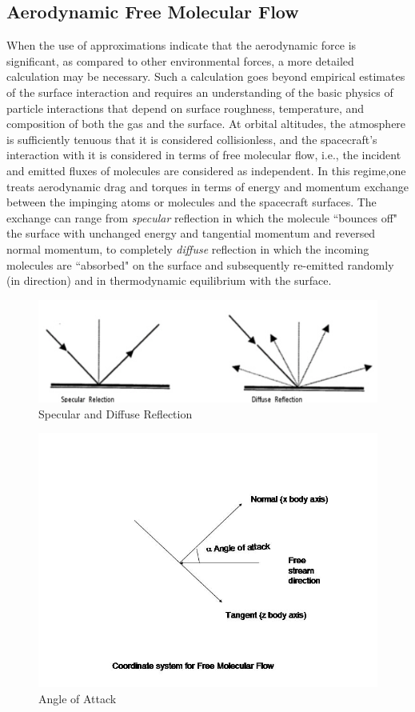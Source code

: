 \subsection{Aerodynamic Free Molecular Flow}
When the use of approximations indicate that the aerodynamic force is
significant, as compared to other environmental forces, a more detailed
calculation may be necessary. Such a calculation goes beyond empirical
estimates of the surface interaction and requires an understanding of the
basic physics of particle interactions that depend on surface roughness,
temperature, and composition of both the gas and the surface.  At orbital
altitudes, the atmosphere is sufficiently tenuous that it is
considered collisionless, and the spacecraft's interaction with it is
considered in terms of free molecular flow, i.e., the incident and emitted
fluxes of molecules are considered as independent.  In this regime,one treats
aerodynamic drag and torques in terms of energy and momentum exchange between
the impinging atoms or molecules and the spacecraft surfaces.  The exchange
can range from {\it specular} reflection in which the molecule ``bounces off"
the surface with unchanged energy and tangential momentum and reversed normal
momentum, to completely {\it diffuse} reflection in which the incoming
molecules are ``absorbed" on the surface and subsequently re-emitted randomly
(in direction) and in thermodynamic equilibrium with the surface.

\begin{figure}[hbpt]
\includegraphics [width=7in]{figs/sd.jpg}
\caption{Specular and Diffuse Reflection}
\label{fig:1}
\end{figure}

\begin{figure}[hbpt]
\includegraphics [width=7in]{figs/fmf.jpg}
\caption{Angle of Attack}
\label{fig:2}
\end{figure}

